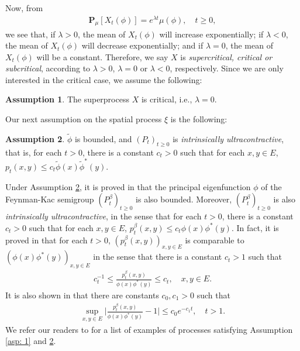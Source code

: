 \documentclass[12pt,a4paper]{amsart}
\theoremstyle{definition}
\newtheorem{asp}{Assumption}
\numberwithin{equation}{section}
\begin{document}
Now, from
\begin{align}
	\mathbf P_\mu[X_t(\phi)]
	= e^{\lambda t} \mu(\phi),
	\quad t \geq 0,
\end{align}
we see that, if $\lambda > 0$, the mean of $X_t(\phi)$ will increase exponentially; if $\lambda < 0$, the mean of $X_t(\phi)$ will decrease exponentially; and if $\lambda = 0$, the mean of $X_t(\phi)$ will be a constant.
Therefore, we say $X$ is \emph{supercritical, critical or subcritical}, according to $\lambda > 0$, $\lambda = 0$ or $\lambda < 0$, respectively.
Since we are only interested in the critical case, we assume the following:
\begin{asp} \label{asp: 2}
  The superprocess $X$ is critical, i.e., $\lambda = 0$.
\end{asp}

Our next assumption on the spatial process $\xi$ is the following:

\begin{asp} \label{asp: 3}
	$\widetilde \phi$ is bounded, and $(P_t)_{t\geq 0}$ is \emph{intrinsically ultracontractive}, that is, for each $t>0$, there is a constant $c_t >0$ such that for each $x,y\in E$, $p_t(x,y) \leq c_t \widetilde \phi(x) \widetilde \phi^*(y)$.
\end{asp}
	
Under Assumption \ref{asp: 3}, it is proved in \cite{RenSongZhang2015Limit, RenSongZhang2017Central} that the principal eigenfunction $\phi$ of the Feynman-Kac semigroup $(P^\beta_t)_{t\geq 0}$ is also bounded.
Moreover, $(P^\beta_t)_{t\geq 0}$ is also \emph{intrinsically ultracontractive}, in the sense that for each $t>0$, there is a constant $c_t >0$ such that for each $x,y\in E$, $p^\beta_t(x,y) \leq c_t \phi(x) \phi^*(y)$.
In fact, it is proved in \cite{KimSong2008Intrinsic} that for each $t>0$, $(p^\beta_t(x,y))_{x,y\in E}$ is comparable to $(\phi(x)\phi^*(y))_{x,y\in E}$ in the sense that there is a constant $c_t > 1$ such that
\begin{align}\label{eq: p-t-beta is comparable to phi phi-star}
	c_t^{-1}
	\leq \frac {p^\beta_t(x,y)} {\phi(x)\phi^*(y)}
	\leq c_t,
	\quad x,y \in E.
\end{align}
It is also shown in \cite{KimSong2008Intrinsic} that there are constants $c_0, c_1 > 0$ such that
\begin{align}\label{eq:q(t,x,y)}
	\sup_{x,y\in E} \Big|\frac{p^\beta_t(x,y)}{\phi(x)\phi^*(y)} - 1 \Big|
	\leq c_0 e^{-c_1 t},
	\quad t > 1.
\end{align}
We refer our readers to \cite{RenSongZhang2015Limit} for a list of examples of processes satisfying Assumption \ref{asp: 1} and \ref{asp: 3}.
\end{document}
